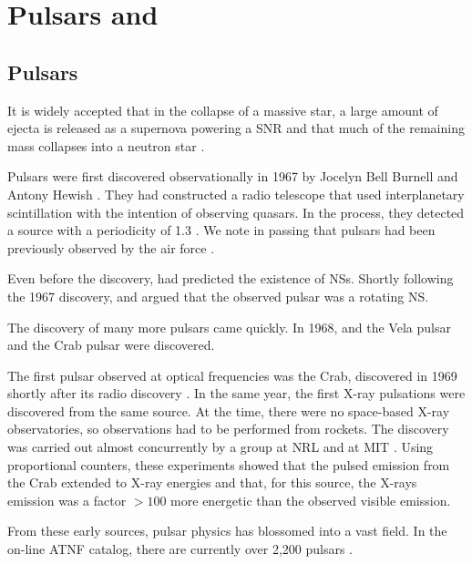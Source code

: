 \section{Pulsars and }

\subsection{Pulsars}

It is widely accepted that in the collapse of a massive star, a large
amount of ejecta is released as a supernova powering a \ac{SNR}
and that much of the remaining mass collapses into a neutron star
\citep{baade_1934a_remarks-super-novae}.

Pulsars were first discovered observationally in 1967 by Jocelyn Bell
Burnell and Antony Hewish \citep{hewish_1968_observation-rapidly}. They
had constructed a radio telescope that used interplanetary scintillation
with the intention of observing quasars.  In the process, they
detected a source with a periodicity of 1.3 \second. We note in
passing that pulsars had been previously observed by the air force
\citep{brumfiel_2007_force-early}.

Even before the discovery, \cite{pacini_1967_energy-emission}
had predicted the existence of \acp{NS}.  Shortly following
the 1967 discovery, \cite{gold_1968_rotating-neutron} and
\cite{pacini_1968_rotating-neutron} argued that the observed pulsar was
a rotating \ac{NS}.

The discovery of many more pulsars came quickly.  In 1968, and the
Vela pulsar \citep{large_1968_pulsar-supernova} and the Crab pulsar
\citep{staelin_1968_pulsating-radio} were discovered.

The first pulsar observed at optical frequencies was the
Crab, discovered in 1969 shortly after its radio discovery
\citep{cocke_1969_discovery-optical}.  In the same year, the first X-ray
pulsations were discovered from the same source. At the time, there were
no space-based X-ray observatories, so observations had to be performed
from rockets.  The discovery was carried out almost concurrently by
a group at \gls{NRL} \citep{fritz_1969_x-ray-pulsar} and at \gls{MIT}
\citep{bradt_1969_x-ray-optical}.  Using proportional counters, these
experiments showed that the pulsed emission from the Crab extended to
X-ray energies and that, for this source, the X-rays emission was a
factor $>100$ more energetic than the observed visible emission.

From these early sources, pulsar physics has blossomed into a vast
field. In the on-line \ac{ATNF} catalog, there are currently over 2,200
pulsars \citep{manchester_2005a_australia-telescope}.

